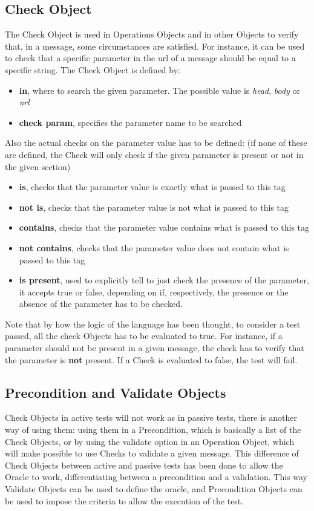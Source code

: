 \subsection{Check Object}
The Check Object is used in Operations Objects and in other Objects to verify that, in a message, some circumstances are satisfied. For instance, it can be used to check that a specific parameter in the url of a message should be equal to a specific string.
The Check Object is defined by:
\begin{itemize}
    \item \textbf{in}, where to search the given parameter. The possible value is \textit{head}, \textit{body} or \textit{url}
    \item \textbf{check param}, specifies the parameter name to be searched
\end{itemize}
Also the actual checks on the parameter value has to be defined: (if none of these are defined, the Check will only check if the given parameter is present or not in the given section)
\begin{itemize}
    \item \textbf{is}, checks that the parameter value is exactly what is passed to this tag
    \item \textbf{not is}, checks that the parameter value is not what is passed to this tag
    \item \textbf{contains}, checks that the parameter value contains what is passed to this tag 
    \item \textbf{not contains}, checks that the parameter value does not contain what is passed to this tag 
    \item \textbf{is present}, used to explicitly tell to just check the presence of the parameter, it accepts true or false, depending on if, respectively, the presence or the absence of the parameter has to be checked.
\end{itemize}

Note that by how the logic of the language has been thought, to consider a test passed, all the check Objects has to be evaluated to true. For instance, if a parameter should not be present in a given message, the check has to verify that the parameter is \textbf{not} present. If a Check is evaluated to false, the test will fail.

\subsection{Precondition and Validate Objects}
Check Objects in active tests will not work as in passive tests, there is another way of using them: using them in a Precondition, which is basically a list of the Check Objects, or by using the validate option in an Operation Object, which will make possible to use Checks to validate a given message. This difference of Check Objects between active and passive tests has been done to allow the Oracle to work, differentiating between a precondition and a validation. This way Validate Objects can be used to define the oracle, and Precondition Objects can be used to impose the criteria to allow the execution of the test.

